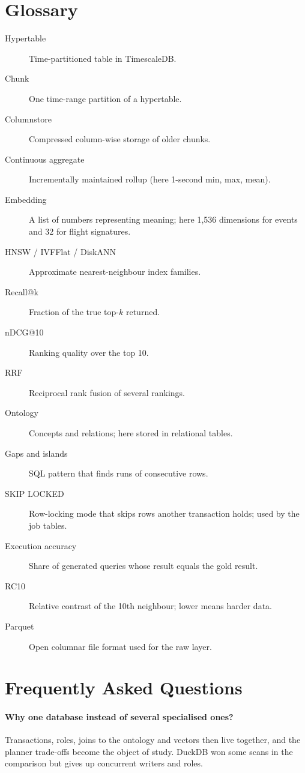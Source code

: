 \documentclass[11pt,a4paper]{article}
\begin{document}
\section{Glossary}
\begin{description}
  \item[Hypertable] Time-partitioned table in TimescaleDB.
  \item[Chunk] One time-range partition of a hypertable.
  \item[Columnstore] Compressed column-wise storage of older chunks.
  \item[Continuous aggregate] Incrementally maintained rollup (here 1-second min, max, mean).
  \item[Embedding] A list of numbers representing meaning; here 1,536 dimensions for events and 32 for flight signatures.
  \item[HNSW / IVFFlat / DiskANN] Approximate nearest-neighbour index families.
  \item[Recall@k] Fraction of the true top-$k$ returned.
  \item[nDCG@10] Ranking quality over the top 10.
  \item[RRF] Reciprocal rank fusion of several rankings.
  \item[Ontology] Concepts and relations; here stored in relational tables.
  \item[Gaps and islands] SQL pattern that finds runs of consecutive rows.
  \item[SKIP LOCKED] Row-locking mode that skips rows another transaction holds; used by the job tables.
  \item[Execution accuracy] Share of generated queries whose result equals the gold result.
  \item[RC10] Relative contrast of the 10th neighbour; lower means harder data.
  \item[Parquet] Open columnar file format used for the raw layer.
\end{description}

\section{Frequently Asked Questions}
\paragraph{Why one database instead of several specialised ones?}
Transactions, roles, joins to the ontology and vectors then live together, and the planner trade-offs become the object of study. DuckDB won some scans in the comparison but gives up concurrent writers and roles.
\end{document}
